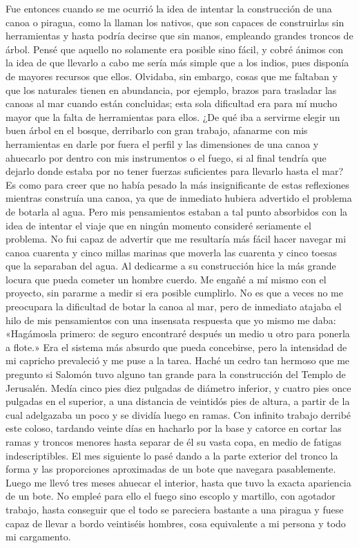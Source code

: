 \documentclass{novela}
\begin{document}
    Fue entonces cuando se me ocurrió la idea de intentar la construcción de una canoa o piragua, como la llaman los nativos, que son capaces de construirlas sin herramientas y hasta podría decirse que sin manos, empleando grandes troncos de árbol. Pensé que aquello no solamente era posible sino fácil, y cobré ánimos con la idea de que llevarlo a cabo me sería más simple que a los indios, pues disponía de mayores recursos que ellos. Olvidaba, sin embargo, cosas que me faltaban y que los naturales tienen en abundancia, por ejemplo, brazos para trasladar las canoas al mar cuando están concluidas; esta sola dificultad era para mí mucho mayor que la falta de herramientas para ellos. ¿De qué iba a servirme elegir un buen árbol en el bosque, derribarlo con gran trabajo, afanarme con mis herramientas en darle por fuera el perfil y las dimensiones de una canoa y ahuecarlo por dentro con mis instrumentos o el fuego, si al final tendría que dejarlo donde estaba por no tener fuerzas suficientes para llevarlo hasta el mar?
    Es como para creer que no había pesado la más insignificante de estas reflexiones mientras construía una canoa, ya que de inmediato hubiera advertido el problema de botarla al agua. Pero mis pensamientos estaban a tal punto absorbidos con la idea de intentar el viaje que en ningún momento consideré seriamente el problema. No fui capaz de advertir que me resultaría más fácil hacer navegar mi canoa cuarenta y cinco millas marinas que moverla las cuarenta y cinco toesas que la separaban del agua.
    Al dedicarme a su construcción hice la más grande locura que pueda cometer un hombre cuerdo. Me engañé a mí mismo con el proyecto, sin pararme a medir si era posible cumplirlo. No es que a veces no me preocupara la dificultad de botar la canoa al mar, pero de inmediato atajaba el hilo de mis pensamientos con una insensata respuesta que yo mismo me daba: «Hagámosla primero: de seguro encontraré después un medio u otro para ponerla a flote.»
    Era el sistema más absurdo que pueda concebirse, pero la intensidad de mi capricho prevaleció y me puse a la tarea. Haché un cedro tan hermoso que me pregunto si Salomón tuvo alguno tan grande para la construcción del Templo de Jerusalén. Medía cinco pies diez pulgadas de diámetro inferior, y cuatro pies once pulgadas en el superior, a una distancia de veintidós pies de altura, a partir de la cual adelgazaba un poco y se dividía luego en ramas. Con infinito trabajo derribé este coloso, tardando veinte días en hacharlo por la base y catorce en cortar las ramas y troncos menores hasta separar de él su vasta copa, en medio de fatigas indescriptibles. El mes siguiente lo pasé dando a la parte exterior del tronco la forma y las proporciones aproximadas de un bote que navegara pasablemente. Luego me llevó tres meses ahuecar el interior, hasta que tuvo la exacta apariencia de un bote. No empleé para ello el fuego sino escoplo y martillo, con agotador trabajo, hasta conseguir que el todo se pareciera bastante a una piragua y fuese capaz de llevar a bordo veintiséis hombres, cosa equivalente a mi persona y todo mi cargamento.
\end{document}

